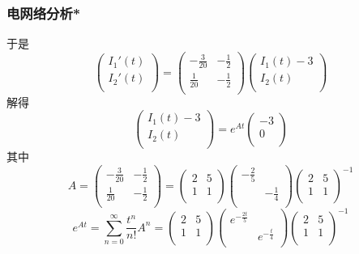 \begin{frame}\frametitle{电网络分析*}
    于是
    \begin{equation*}
    \begin{pmatrix}I_1'(t)\\I_2'(t)\\\end{pmatrix}
    =\begin{pmatrix}-\frac{3}{20}&-\frac12\\\frac1{20}&-\frac12\\\end{pmatrix}
    \begin{pmatrix}I_1(t)-3\\I_2(t)\\\end{pmatrix}
    \end{equation*}
    解得
    \[\begin{pmatrix}I_1(t)-3\\I_2(t)\\\end{pmatrix} = e^{At}\begin{pmatrix}-3\\0\\\end{pmatrix}\]
    其中
    \[A=\begin{pmatrix}-\frac{3}{20}&-\frac12\\\frac1{20}&-\frac12\\\end{pmatrix}
    =\begin{pmatrix}2&5\\1&1\\\end{pmatrix} \begin{pmatrix}-\frac25&\\&-\frac14\\\end{pmatrix}\begin{pmatrix}2&5\\1&1\\\end{pmatrix}^{-1}\]
    \[e^{At}=\sum_{n=0}^{\infty}\frac{t^n}{n!}A^n=\begin{pmatrix}2&5\\1&1\\\end{pmatrix} \begin{pmatrix}e^{-\frac{2t}5}&\\&e^{-\frac{t}4}\\\end{pmatrix}\begin{pmatrix}2&5\\1&1\\\end{pmatrix}^{-1}\]

\end{frame}
